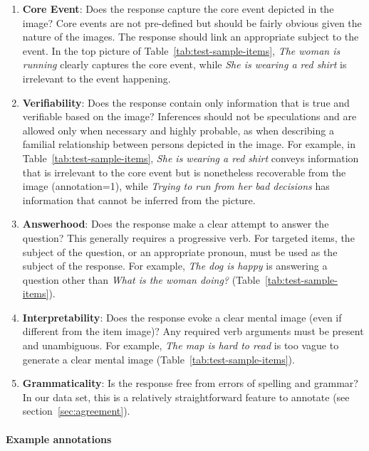 \documentclass[11pt,a4paper]{article}
\newcommand{\lk}[1]{\marginpar{\scriptsize LK: #1}}
\begin{document}
\begin{enumerate}
\item \textbf{Core Event}: Does the response capture the core event depicted in the image? Core events are not pre-defined but should be fairly obvious given the nature of the images. The response should link an appropriate subject to the event.  In the top picture of Table~\ref{tab:test-sample-items}, \textit{The woman is running} clearly captures the core event, while \textit{She is wearing a red shirt} is irrelevant to the event happening.
\item \textbf{Verifiability}: Does the response contain only information that is true and verifiable based on the image? Inferences should not be speculations and are allowed only when necessary and highly probable, as when describing a familial relationship between persons depicted in the image.  For example, in Table~\ref{tab:test-sample-items}, \textit{She is wearing a red shirt} conveys information that is irrelevant to the core event but is nonetheless recoverable from the image (annotation=1), while \textit{Trying to run from her bad decisions} has information that cannot be inferred from the picture.
\item \textbf{Answerhood}: Does the response make a clear attempt to answer the question? This generally requires a progressive verb. For targeted items, the subject of the question, or an appropriate pronoun, must be used as the subject of the response.  For example, \textit{The dog is happy} is answering a question other than \textit{What is the woman doing?} (Table~\ref{tab:test-sample-items}).
\item \textbf{Interpretability}: Does the response evoke a clear mental image (even if different from the item image)? Any required verb arguments must be present and unambiguous.  For example, \textit{The map is hard to read} is too vague to generate a clear mental image (Table~\ref{tab:test-sample-items}).
\item \textbf{Grammaticality}: Is the response free from errors of spelling and grammar?  
In our data set, this is a relatively straightforward feature to annotate (see section~\ref{sec:agreement}).

\end{enumerate}

\paragraph{Example annotations}
\end{document}
